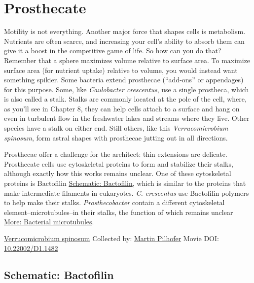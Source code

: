 \documentclass[]{tufte-book}
\begin{document}
\hypertarget{prosthecate}{%
\section{Prosthecate}\label{prosthecate}}

Motility is not everything. Another major force that shapes cells is metabolism. Nutrients are often scarce, and increasing your cell's ability to absorb them can give it a boost in the competitive game of life. So how can you do that? Remember that a sphere maximizes volume relative to surface area. To maximize surface area (for nutrient uptake) relative to volume, you would instead want something spikier. Some bacteria extend prosthecae (``add-ons'' or appendages) for this purpose. Some, like \emph{Caulobacter crescentus}, use a single prostheca, which is also called a stalk. Stalks are commonly located at the pole of the cell, where, as you'll see in Chapter 8, they can help cells attach to a surface and hang on even in turbulent flow in the freshwater lakes and streams where they live. Other species have a stalk on either end. Still others, like this \emph{Verrucomicrobium spinosum}, form astral shapes with prosthecae jutting out in all directions.

Prosthecae offer a challenge for the architect: thin extensions are delicate. Prosthecate cells use cytoskeletal proteins to form and stabilize their stalks, although exactly how this works remains unclear. One of these cytoskeletal proteins is Bactofilin \protect\hyperlink{Bactofilin}{Schematic: Bactofilin}, which is similar to the proteins that make intermediate filaments in eukaryotes. \emph{C. crescentus} use Bactofilin polymers to help make their stalks. \emph{Prosthecobacter} contain a different cytoskeletal element--microtubules--in their stalks, the function of which remains unclear \protect\hyperlink{Bacterial_microtubules}{More: Bacterial microtubules}.



\hypertarget{htmlwidget-c97c5c84cd2099004e2d}{}

\label{fig:3-6}\protect\hyperlink{tree}{Verrucomicrobium spinosum} Collected by: \protect\hyperlink{martin_pilhofer}{Martin Pilhofer} Movie DOI: \href{https://doi.org/10.22002/D1.1482}{10.22002/D1.1482}

\hypertarget{Bactofilin}{%
\subsection*{Schematic: Bactofilin}\label{Bactofilin}}
\end{document}
